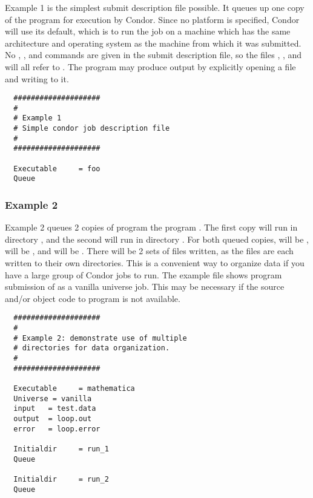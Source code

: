 Example 1 is the simplest submit description
file possible. It queues up one copy of the program  for execution
by Condor.
Since no platform is specified, Condor will use its default,
which is to run the job on a machine which has the
same architecture and operating system as the machine from which it was
submitted. 
No 
,
, and
commands are given in the submit
description file, so the
files , , and  will all refer to 
.
The program may produce output by explicitly opening a file and writing to
it.
\begin{verbatim}
  ####################                                                    
  # 
  # Example 1                                                                       
  # Simple condor job description file                                    
  #                                                                       
  ####################                                                    
                                                                          
  Executable     = foo                                                    
  Queue    
\end{verbatim}

\subsubsection{Example 2}

Example 2 queues 2 copies of program the program . The
first copy will run in directory , and the second will run in
directory . For both queued copies, 
 will be ,
 will be , and
 will be .
There will be 2 sets of files written,
as the files are each written to their own directories.
This is a convenient way to organize data if you
have a large group of Condor jobs to run. The example file 
shows program submission of
 as a vanilla universe job.
This may be necessary if the source
and/or object code to program  is not available.
\begin{verbatim}
  ####################     
  #                       
  # Example 2: demonstrate use of multiple     
  # directories for data organization.      
  #                                        
  ####################                    
                                         
  Executable     = mathematica          
  Universe = vanilla                   
  input   = test.data                
  output  = loop.out                
  error   = loop.error             
                                  
  Initialdir     = run_1         
  Queue                         
                               
  Initialdir     = run_2      
  Queue                     
\end{verbatim}

